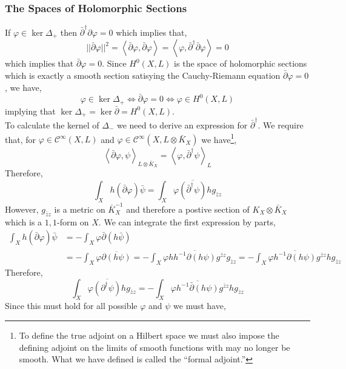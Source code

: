 \documentclass[12pt]{extarticle}
\theoremstyle{definition}
\begin{document}
\subsubsection{The Spaces of Holomorphic Sections}

If $\varphi \in \ker{\Delta_{+}}$ then $\bar{\partial}^\dagger \partial \varphi = 0$ which implies that,
\[ || \bar{\partial} \varphi ||^2 = \left< \bar{\partial} \varphi, \bar{\partial} \varphi \right> = \left<  \varphi, \bar{\partial}^\dagger \bar{\partial} \varphi \right> = 0 \]
which implies that $\bar{\partial} \varphi = 0$.
Since $H^0(X, L)$ is the space of holomorphic sections which is exactly a smooth section satisying the Cauchy-Riemann equation $\bar{\partial} \varphi = 0$, we have,
\[ \varphi \in \ker{\Delta_{+}} \iff \bar{\partial} \varphi = 0 \iff \varphi \in H^0(X, L) \]
implying that $\ker{\Delta_{+}} = \ker{\bar{\partial}} = H^0(X, L)$. 
\bigskip\\
To calculate the kernel of $\Delta_{-}$ we need to derive an expression for $\bar{\partial}^\dagger$. We require that, for $\varphi \in \mathcal{C}^{\infty}(X, L)$ and $\varphi \in \mathcal{C}^{\infty}(X, L \otimes \bar{K}_X)$ we have\footnote{To define the true adjoint on a Hilbert space we must also impose the defining adjoint on the limits of smooth functions with may no longer be smooth. What we have defined is called the ``formal adjoint.''},
\[ \left< \bar{\partial} \varphi, \psi \right>_{L \otimes \bar{K}_X} = \left< \varphi, \bar{\partial}^\dagger \psi \right>_L \]
Therefore,
\[ \int_X h (\bar{\partial} \varphi) \bar{\psi} = \int_X \varphi \overline{\left( \bar{\partial}^\dagger \psi \right)} h g_{\bar{z} z} \]
However, $g_{\bar{z} z}$ is a metric on $\bar{K}_X^{-1}$ and therefore a postive section of $K_X \otimes \bar{K}_X$ which is a $1,1$-form on $X$. 
We can integrate the first expression by parts,
\begin{align*}
\int_X h (\bar{\partial} \varphi) \bar{\psi} & = - \int_X \varphi \bar{\partial} \left( h \bar{\psi} \right) 
\\
& = - \int_X \varphi \overline{ \partial \left( h \psi \right)} = - \int_X \varphi  h \overline{h^{-1} \partial ( h \psi)} g^{\bar{z} z} g_{\bar{z} z} 
= - \int_X \varphi  \overline{h^{-1} \partial ( h \psi)} g^{\bar{z} z} h g_{\bar{z} z} 
\end{align*}
Therefore,
\[ \int_X \varphi  \overline{\left( \partial^\dagger \psi \right)} h g_{\bar{z} z} = - \int_X \varphi  \overline{h^{-1} \bar{\partial} ( h \psi)} g^{\bar{z} z} h g_{\bar{z} z} \]
Since this must hold for all possible $\varphi$ and $\psi$ we must have,
\end{document}
